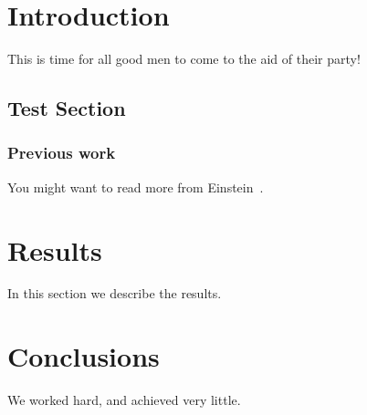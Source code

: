 \documentclass[a4paper, 11pt, oneside]{thesis/HSR}  %
\begin{document}

\mainmatter    %
\pagestyle{fancy}  %









\chapter{Introduction}
This is time for all good men to come to the aid of their party!

\section{Test Section}\label{test section}
\Blindtext
\Blindtext
\Blindtext

\subsection{Previous work}\label{previous work}
You might want to read more from Einstein~\cite{Einstein}.

\chapter{Results}\label{results}
In this section we describe the results.
\Blindtext

\chapter{Conclusions}\label{conclusions}
We worked hard, and achieved very little.
\Blindtext

\end{document}

